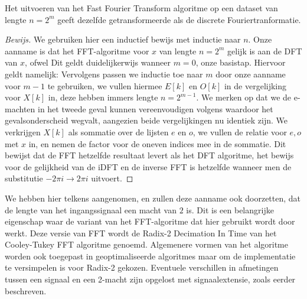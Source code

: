 \begin{stelling}[]
  Het uitvoeren van het Fast Fourier Transform algoritme op een dataset van lengte $n=2^m$ geeft
  dezelfde getransformeerde als de discrete Fouriertranformatie.
\end{stelling}
\begin{proof}[Bewijs]
We gebruiken hier een inductief bewijs met inductie naar $n$. Onze aanname is dat het FFT-algoritme voor $x$ van lengte $n=2^m$ gelijk is aan de DFT van $x$, ofwel
Dit geldt duidelijkerwijs wanneer $m=0$, onze basistap. Hiervoor geldt namelijk:
Vervolgens passen we inductie toe naar $m$ door onze aanname voor $m-1$ te gebruiken,
we vullen hiermee $E[k]$ en $O[k]$ in de vergelijking voor $X[k]$ in, deze hebben immers lengte $n=2^{m-1}$.
We merken op dat we de e-machten in het tweede geval kunnen vereenvoudigen volgens
waardoor het gevalsonderscheid wegvalt, aangezien beide vergelijkingen nu identiek zijn.
We verkrijgen $X[k]$ als sommatie over de lijsten $e$ en $o$, we vullen de relatie voor $e,o$ met $x$ in, en nemen de factor voor de oneven indices mee in de sommatie.
Dit bewijst dat de FFT hetzelfde resultaat levert als het DFT algoritme, het bewijs voor de gelijkheid van de iDFT en de inverse FFT is 
hetzelfde wanneer men de substitutie $-2\pi i \rightarrow 2\pi i$ uitvoert.
\end{proof}

\begin{opmerk}
We hebben hier telkens aangenomen, en zullen deze aanname ook doorzetten, 
dat de lengte van het ingangssignaal een macht van $2$ is. Dit is een belangrijke
eigenschap waar de variant van het FFT-algoritme dat hier gebruikt wordt door werkt. Deze versie van FFT wordt
de Radix-2 Decimation In Time van het Cooley-Tukey FFT algoritme genoemd. Algemenere vormen van het algoritme
worden ook toegepast in geoptimaliseerde algoritmes maar om de implementatie te versimpelen 
is voor Radix-2 gekozen. Eventuele verschillen in afmetingen tussen een signaal en 
een 2-macht zijn opgelost met signaalextensie, zoals eerder beschreven.
\end{opmerk}

